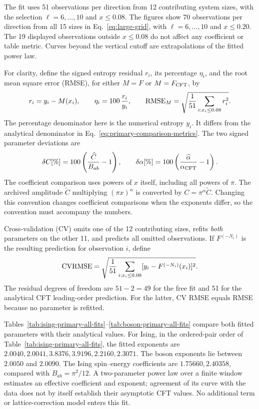 The fit uses 51 observations per direction from 12 contributing
system sizes, with the selection $\ell=6,\ldots,10$ and $x\leq0.08$.
The figures show 70 observations per direction from all 15 sizes
in Eq.~\eqref{eq:large-grid}, with $\ell=6,\ldots,10$ and $x\leq0.20$.
The 19 displayed observations outside $x\leq0.08$ do not affect any
coefficient or table metric. Curves beyond the vertical cutoff are
extrapolations of the fitted power law.

For clarity, define the signed entropy residual $r_i$, its percentage
$\eta_i$, and the root mean square error (RMSE), for either
$M=F$ or $M=F_{\rm CFT}$, by
\begin{equation}
 r_i=y_i-M(x_i),\qquad
 \eta_i=100\,\frac{r_i}{y_i},\qquad
 {\rm RMSE}_M=\sqrt{\frac{1}{51}\sum_{i:x_i\leq0.08}r_i^2}.
 \label{eq:primary-fit-residual}
\end{equation}
The percentage denominator here is the numerical entropy $y_i$.
It differs from the analytical denominator in
Eq.~\eqref{eq:primary-comparison-metrics}.
The two signed parameter deviations are
\begin{equation}
 \delta C[\%]=100\left(\frac{\widehat C}{B_{ab}}-1\right),
 \qquad
 \delta\alpha[\%]=100\left(
       \frac{\widehat\alpha}{\alpha_{\rm CFT}}-1\right).
 \label{eq:primary-parameter-errors}
\end{equation}
The coefficient comparison uses powers of $x$ itself, including all powers of $\pi$.
The archived amplitude $\widetilde C$ multiplying $(\pi x)^\alpha$
is converted by $C=\pi^\alpha\widetilde C$.
Changing this convention changes coefficient comparisons when the
exponents differ, so the convention must accompany the numbers.

Cross-validation (CV) omits one of the 12 contributing sizes,
refits \emph{both} parameters on the other 11, and predicts all
omitted observations. If $F^{(-N_i)}$ is the resulting prediction
for observation $i$, define
\begin{equation}
 {\rm CVRMSE}=\sqrt{\frac1{51}\sum_{i:x_i\leq0.08}
       [y_i-F^{(-N_i)}(x_i)]^2}.
 \label{eq:primary-free-cv}
\end{equation}
The residual degrees of freedom are $51-2=49$ for the free fit
and 51 for the analytical CFT leading-order prediction.
For the latter, CV RMSE equals RMSE because no parameter is refitted.

Tables~\ref{tab:ising-primary-all-fits}--\ref{tab:boson-primary-all-fits}
compare both fitted parameters with their analytical values.
For Ising, in the ordered-pair order of Table~\ref{tab:ising-primary-all-fits}, the fitted exponents are $2.0040, 2.0041, 3.8376, 3.9196, 2.2160, 2.3071$.
The boson exponents lie between $2.0050$ and $2.0090$.
The Ising spin--energy coefficients are $1.75660, 2.40358$, compared with $B_{ab}=\pi^2/12$.
A two-parameter power law over a finite window estimates an effective
coefficient and exponent; agreement of its curve with the data
does not by itself establish their asymptotic CFT values.
No additional term or lattice-correction model enters this fit.

